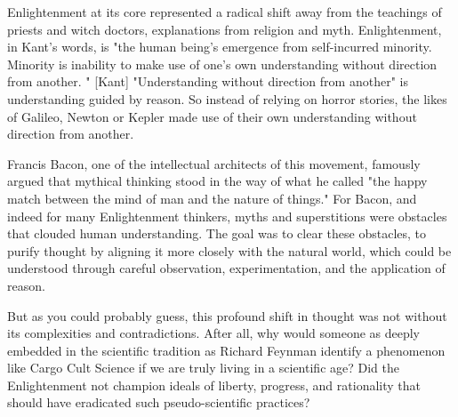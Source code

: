 Enlightenment at its core represented a radical shift away from the teachings
of priests and witch doctors, explanations from religion and myth.
Enlightenment, in Kant's words, is "the human being's emergence from
self-incurred minority. Minority is inability to make use of one's own
understanding without direction from another. " [Kant] "Understanding without
direction from another" is understanding guided by reason. So instead of
relying on horror stories, the likes of Galileo, Newton or Kepler made use of
their own understanding without direction from another.

Francis Bacon, one of the intellectual architects of this movement, famously
argued that mythical thinking stood in the way of what he called "the happy
match between the mind of man and the nature of things." For Bacon, and indeed
for many Enlightenment thinkers, myths and superstitions were obstacles that
clouded human understanding. The goal was to clear these obstacles, to purify
thought by aligning it more closely with the natural world, which could be
understood through careful observation, experimentation, and the application of
reason.


%

But as you could probably guess, this profound shift in thought was not without
its complexities and contradictions. After all, why would someone as deeply
embedded in the scientific tradition as Richard Feynman identify a phenomenon
like Cargo Cult Science if we are truly living in a scientific age? Did the
Enlightenment not champion ideals of liberty, progress, and rationality that
should have eradicated such pseudo-scientific practices?


